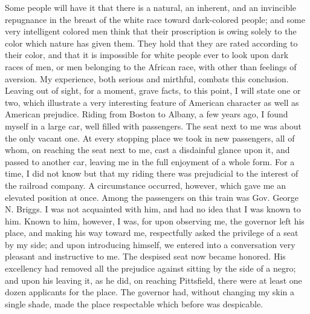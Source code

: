 Some people will have it that there is a natural, an inherent, and an
invincible repugnance in the breast of the white race toward
dark-colored people; and some very intelligent colored men think that
their proscription is owing solely to the color which nature has given
them. They hold that they are rated according to their color, and that
it is impossible for white people ever to look upon dark races of men,
or men belonging to the African race, with other than feelings of
aversion. My experience, both serious and mirthful, combats this
conclusion. Leaving out of sight, for a moment, grave facts, to this
point, I will state one or two, which illustrate a very interesting
feature of American character as well as American prejudice. Riding from
Boston to Albany, a few years ago, I found myself in a large car, well
filled with passengers. The seat next to me was about the only vacant
one. At every stopping place we took in new passengers, all of whom, on
reaching {}the seat next to me, cast a disdainful glance upon it, and
passed to another car, leaving me in the full enjoyment of a whole form.
For a time, I did not know but that my riding there was prejudicial to
the interest of the railroad company. A circumstance occurred, however,
which gave me an elevated position at once. Among the passengers on this
train was Gov. George N. Briggs. I was not acquainted with him, and had
no idea that I was known to him. Known to him, however, I was, for upon
observing me, the governor left his place, and making his way toward me,
respectfully asked the privilege of a seat by my side; and upon
introducing himself, we entered into a conversation very pleasant and
instructive to me. The despised seat now became honored. His excellency
had removed all the prejudice against sitting by the side of a negro;
and upon his leaving it, as he did, on reaching Pittsfield, there were
at least one dozen applicants for the place. The governor had, without
changing my skin a single shade, made the place respectable which before
was despicable.

